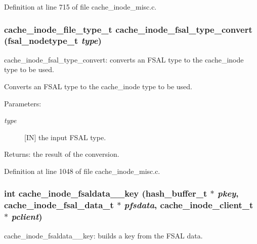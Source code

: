 Definition at line 715 of file cache\_\-inode\_\-misc.c.
\subsubsection[{cache\_\-inode\_\-fsal\_\-type\_\-convert}]{\setlength{\rightskip}{0pt plus 5cm}cache\_\-inode\_\-file\_\-type\_\-t cache\_\-inode\_\-fsal\_\-type\_\-convert (fsal\_\-nodetype\_\-t {\em type})}\label{cache__inode__misc_8c_8f6934bbf38300379caf1342b6a63b26}


cache\_\-inode\_\-fsal\_\-type\_\-convert: converts an FSAL type to the cache\_\-inode type to be used.

Converts an FSAL type to the cache\_\-inode type to be used.

\begin{Desc}
\item[Parameters:]
\begin{description}
\item[{\em type}][IN] the input FSAL type.\end{description}
\end{Desc}
\begin{Desc}
\item[Returns:]the result of the conversion. \end{Desc}


Definition at line 1048 of file cache\_\-inode\_\-misc.c.
\subsubsection[{cache\_\-inode\_\-fsaldata\_\-2\_\-key}]{\setlength{\rightskip}{0pt plus 5cm}int cache\_\-inode\_\-fsaldata\_\_\-key (hash\_\-buffer\_\-t $\ast$ {\em pkey}, \/  cache\_\-inode\_\-fsal\_\-data\_\-t $\ast$ {\em pfsdata}, \/  cache\_\-inode\_\-client\_\-t $\ast$ {\em pclient})}\label{cache__inode__misc_8c_7bf5883d643f1a7940f2290a6d2d9686}


cache\_\-inode\_\-fsaldata\_\_\-key: builds a key from the FSAL data.

